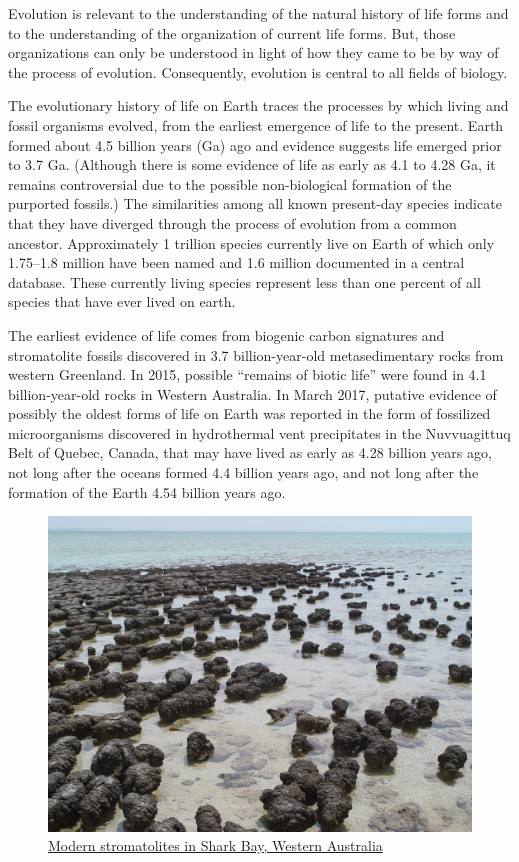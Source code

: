 Evolution is relevant to the understanding of the natural history of life forms and to the understanding of the organization of current life forms. But, those organizations can only be understood in light of how they came to be by way of the process of evolution. Consequently, evolution is central to all fields of biology.

The evolutionary history of life on Earth traces the processes by which living and fossil organisms evolved, from the earliest emergence of life to the present. Earth formed about 4.5 billion years (Ga) ago and evidence suggests life emerged prior to 3.7 Ga. (Although there is some evidence of life as early as 4.1 to 4.28 Ga, it remains controversial due to the possible non-biological formation of the purported fossils.) The similarities among all known present-day species indicate that they have diverged through the process of evolution from a common ancestor. Approximately 1 trillion species currently live on Earth of which only 1.75--1.8 million have been named and 1.6 million documented in a central database. These currently living species represent less than one percent of all species that have ever lived on earth.

The earliest evidence of life comes from biogenic carbon signatures and stromatolite fossils discovered in 3.7 billion-year-old metasedimentary rocks from western Greenland. In 2015, possible ``remains of biotic life'' were found in 4.1 billion-year-old rocks in Western Australia. In March 2017, putative evidence of possibly the oldest forms of life on Earth was reported in the form of fossilized microorganisms discovered in hydrothermal vent precipitates in the Nuvvuagittuq Belt of Quebec, Canada, that may have lived as early as 4.28 billion years ago, not long after the oceans formed 4.4 billion years ago, and not long after the formation of the Earth 4.54 billion years ago.



\begin{figure}

{\centering \includegraphics[width=0.7\linewidth]{./figures/life/Stromatolites_in_Sharkbay} 

}

\caption{\href{https://commons.wikimedia.org/wiki/File:Stromatolites_in_Sharkbay.jpg}{Modern stromatolites in Shark Bay, Western Australia}}\label{fig:stromatolites}
\end{figure}

